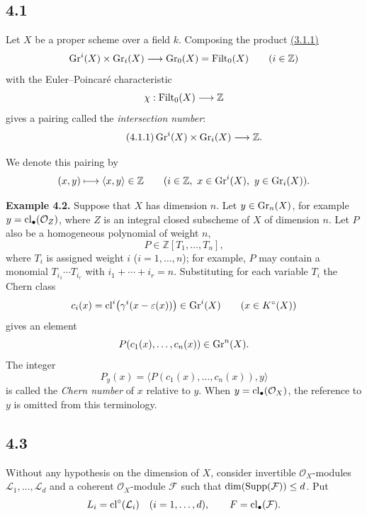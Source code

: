 \subsection*{4.1}
Let $X$ be a proper scheme over a field $k$. Composing the product \hyperlink{sga6.e10.eq.3-1-1}{(3.1.1)}
\[
\operatorname{Gr}^i(X)\times\operatorname{Gr}_i(X)\longrightarrow\operatorname{Gr}_0(X)=\operatorname{Filt}_0(X)
\qquad(i\in\mathbb Z)
\]
with the Euler--Poincar\'e characteristic
\[
\chi:\operatorname{Filt}_0(X)\longrightarrow\mathbb Z
\]
gives a pairing called the \emph{intersection number}:
\begin{equation}\tag{4.1.1}
\operatorname{Gr}^i(X)\times\operatorname{Gr}_i(X)\longrightarrow\mathbb Z.
\end{equation}

We denote this pairing by
\[
(x,y)\longmapsto\langle x,y\rangle\in\mathbb Z
\qquad(i\in\mathbb Z,\ x\in\operatorname{Gr}^i(X),\ y\in\operatorname{Gr}_i(X)).
\]

\textbf{Example 4.2.}
Suppose that $X$ has dimension $n$. Let $y\in\operatorname{Gr}_n(X)$, for example
$y=\operatorname{cl}_\bullet(\mathcal O_Z)$, where $Z$ is an integral closed subscheme of
$X$ of dimension $n$. Let $P$ also be a homogeneous polynomial of weight $n$,
\[
P\in\mathbb Z[T_1,\ldots,T_n],
\]
where $T_i$ is assigned weight $i$ ($i=1,\ldots,n$); for example, $P$ may
contain a monomial $T_{i_1}\cdots T_{i_r}$ with
$i_1+\cdots+i_r=n$. Substituting for each variable $T_i$ the Chern class
\[
c_i(x)=\operatorname{cl}^i\bigl(\gamma^i(x-\varepsilon(x))\bigr)\in\operatorname{Gr}^i(X)
\qquad(x\in K^\circ(X))
\]
gives an element
\[
P(c_1(x),\ldots,c_n(x))\in\operatorname{Gr}^n(X).
\]
The integer
\[
P_y(x)=\bigl\langle P(c_1(x),\ldots,c_n(x)),y\bigr\rangle
\]
is called the \emph{Chern number} of $x$ relative to $y$. When
$y=\operatorname{cl}_\bullet(\mathcal O_X)$, the reference to $y$ is omitted from this
terminology.

\subsection*{4.3}
Without any hypothesis on the dimension of $X$, consider invertible
$\mathcal O_X$-modules $\mathcal L_1,\ldots,\mathcal L_d$ and a coherent
$\mathcal O_X$-module $\mathcal F$ such that
$\dim(\operatorname{Supp}(\mathcal F))\leq d$. Put
\[
L_i=\operatorname{cl}^\circ(\mathcal L_i)\quad(i=1,\ldots,d),
\qquad F=\operatorname{cl}_\bullet(\mathcal F).
\]

